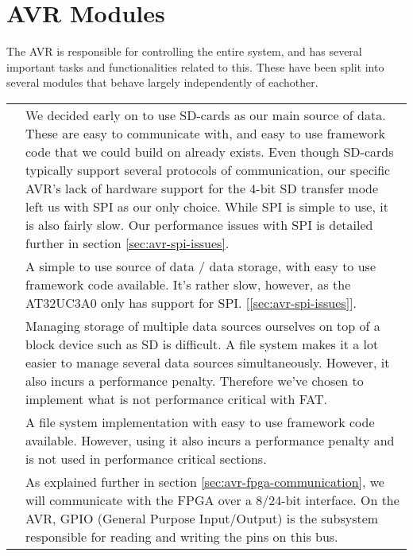\section{AVR Modules}


The AVR is responsible for controlling the entire system, and has several
important tasks and functionalities related to this. These have been split
into several modules that behave largely independently of eachother.

\begin{table}[htbp]
\centering
\begin{tabular}{l|p{10cm}}
\begin{comment}
	SD over SPI & We decided early on to use SD-cards as our main source of data. These
	are easy to communicate with, and easy to use framework code that we
	could build on already exists.
	Even though SD-cards typically support several protocols of
	communication, our specific AVR's lack of hardware support for the 4-bit
	SD transfer mode left us with SPI as our only choice. While SPI is
	simple to use, it is also fairly slow. Our performance issues with SPI
	is detailed further in section \ref{sec:avr-spi-issues}. \\
\end{comment}
	SD over SPI & A simple to use source of data / data storage, with easy to use
	framework code available. It's rather slow, however, as the AT32UC3A0 only has
	support for SPI. [\ref{sec:avr-spi-issues}]. \\
	\hline
\begin{comment}
	FAT & Managing storage of multiple data sources ourselves on top of a block
	device such as SD is difficult. A file system makes it a lot easier
	to manage several data sources simultaneously. However, it also incurs a
	performance penalty. Therefore we've chosen to implement what is not performance
	critical with FAT. \\
\end{comment}
	FAT & A file system implementation with easy to use framework code available. However,
	using it also incurs a performance penalty and is not used in performance critical
	sections. \\
	\hline
\begin{comment}
	FPGA/GPIO & As explained further in section \ref{sec:avr-fpga-communication}, we
	will communicate with the FPGA over a 8/24-bit interface. On the AVR,
	GPIO (General Purpose Input/Output) is the subsystem responsible for
	reading and writing the pins on this bus.

\end{comment}
\end{tabular}
\end{table}

